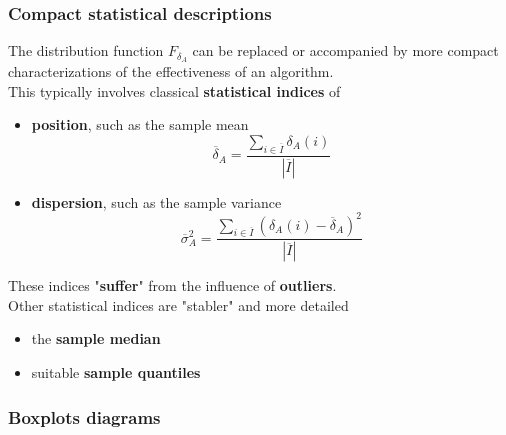 \documentclass[11pt]{article}
\begin{document}
	
	\newpage
	
	\subsubsection{Compact statistical descriptions}
	The distribution function $F_{\delta_A}$ can be replaced or accompanied by more compact characterizations of the effectiveness of an algorithm.\\
	
	This typically involves classical \textbf{statistical indices} of 
	\begin{itemize}
		\item \textbf{position}, such as the sample mean
		$$ \overline{\delta}_A = \frac{\sum_{i \in \overline{I}} \delta_A (i)}{|\overline{I}|} $$
		\item \textbf{dispersion}, such as the sample variance
		$$ \overline{\sigma}_A^2 = \frac{\sum_{i \in \overline{I}} \left(\delta_A (i) - \overline{\delta}_A \right)^2}{|\overline{I}|} $$
	\end{itemize}
	These indices "\textbf{suffer}" from the influence of \textbf{outliers}.\\
	
	Other statistical indices are "stabler" and more detailed
	\begin{itemize}
		\item the \textbf{sample median}
		\item suitable \textbf{sample quantiles}
	\end{itemize}
	
	\newpage
	
	\subsubsection{Boxplots diagrams}
\end{document}
